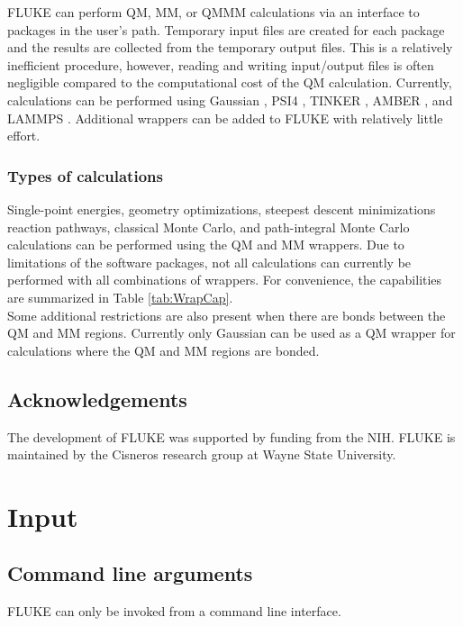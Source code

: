 \documentclass[12pt]{report}
\begin{document}
FLUKE can perform QM, MM, or QMMM calculations via an interface to packages
in the user's path. Temporary input files are created for each package and
the results are collected from the temporary output files. This is a
relatively inefficient procedure, however, reading and writing input/output
files is often negligible compared to the computational cost of the QM
calculation. Currently, calculations can be performed using Gaussian
\cite{Frisch2009}, PSI4 \cite{Turney2012}, TINKER \cite{}, AMBER \cite{}, and
LAMMPS \cite{Plimpton1995}. Additional wrappers can be added to FLUKE with
relatively little effort.

\subsection{Types of calculations}

Single-point energies, geometry optimizations, steepest descent minimizations
reaction pathways, classical Monte Carlo, and path-integral Monte Carlo
calculations can be performed using the QM and MM wrappers. Due to limitations
of the software packages, not all calculations can currently be performed with
all combinations of wrappers. For convenience, the capabilities are summarized
in Table \ref{tab:WrapCap}. \\

Some additional restrictions are also present when there are bonds between
the QM and MM regions. Currently only Gaussian can be used as a QM wrapper
for calculations where the QM and MM regions are bonded.

\FloatBarrier

\section{Acknowledgements}

The development of FLUKE was supported by funding from the NIH. FLUKE is
maintained by the Cisneros research group at Wayne State University.

\chapter{Input}

\section{Command line arguments}

FLUKE can only be invoked from a command line interface.
\end{document}
